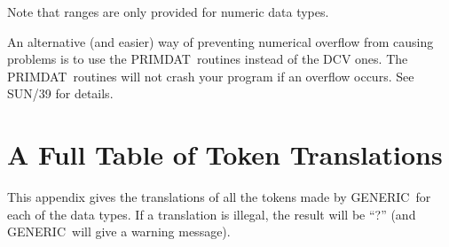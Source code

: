 \documentclass[twoside,11pt]{article}
\renewcommand{\_}{{\tt\char'137}}     %
\newcommand{\xref}[3]{#1}
\newcommand{\xlabel}[1]{}
\newcommand{\GENERIC}{{\footnotesize GENERIC}\normalsize}
\newcommand{\PRIMDAT}{{\footnotesize PRIMDAT}\normalsize}
\begin{document}
Note that ranges are only provided for numeric data types.

An alternative (and easier) way of preventing numerical overflow from
causing problems is to use the \PRIMDAT\ routines instead of the
DCV ones.  The \PRIMDAT\ routines will not crash your program if an
overflow occurs.  See \xref{SUN/39}{sun39}{} for details.

\appendix
\newpage
\section{\xlabel{ap_a}A Full Table of Token Translations\label{ap_a}}

This appendix gives the translations of all the tokens
made by \GENERIC\ for each of the data types.
If a translation is illegal, the result will be ``?''
(and \GENERIC\ will give a warning message).
\end{document}
